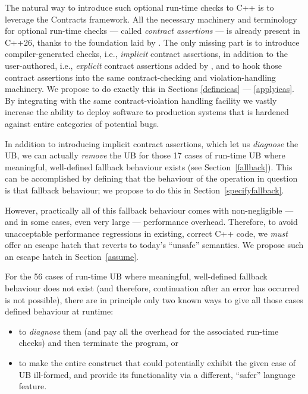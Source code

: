 The natural way to introduce such optional run-time checks to C++ is to leverage the Contracts framework. All the necessary machinery and terminology for optional run-time checks --- called \emph{contract assertions} --- is already present in C++26, thanks to the foundation laid by \cite{P2900R14}. The only missing part is to introduce compiler-generated checks, i.e., \emph{implicit} contract assertions, in addition to the user-authored, i.e., \emph{explicit} contract assertions added by \cite{P2900R14}, and to hook those contract assertions into the same contract-checking and violation-handling machinery. We propose to do exactly this in Sections \ref{defineicas} --- \ref{applyicas}.  By integrating with the same contract-violation handling facility we vastly increase the ability to deploy software to production systems that is hardened against entire categories of potential bugs.

In addition to introducing implicit contract assertions, which let us \emph{diagnose} the UB, we can actually \emph{remove} the UB for those 17 cases of run-time UB where meaningful, well-defined fallback behaviour exists (see Section~\ref{fallback}). This can be accomplished by defining that the behaviour of the operation in question is that fallback behaviour; we propose to do this in Section~\ref{specifyfallback}.

However, practically all of this fallback behaviour comes with non-negligible --- and in some cases, even very large --- performance overhead. Therefore, to avoid unacceptable performance regressions in existing, correct C++ code, we \emph{must} offer an escape hatch that reverts to today's ``unsafe'' semantics. We propose such an escape hatch in Section~\ref{assume}.

For the 56 cases of run-time UB where meaningful, well-defined fallback behaviour does not exist (and therefore, continuation after an error has occurred is not possible), there are in principle only two known ways to give all those cases defined behaviour at runtime:
\begin{itemize}
\item to \emph{diagnose} them (and pay all the overhead for the associated run-time checks) and then terminate the program, or
\item to make the entire construct that could potentially exhibit the given case of UB ill-formed, and provide its functionality via a different, ``safer'' language feature.
\end{itemize}

